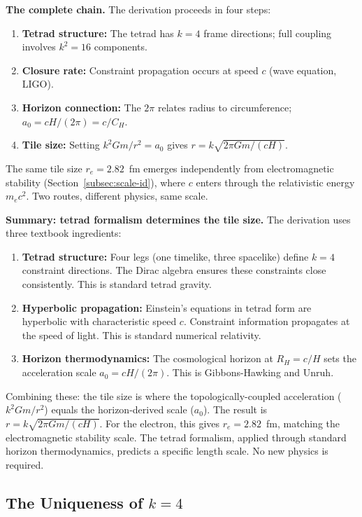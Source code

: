 \documentclass[aps,prd,preprint,superscriptaddress,showpacs,preprintnumbers,amsmath,amssymb,nofootinbib]{revtex4-2}
\begin{document}
\textbf{The complete chain.} The derivation proceeds in four steps:
\begin{enumerate}
\item \textbf{Tetrad structure:} The tetrad has $k=4$ frame directions; full coupling involves $k^2 = 16$ components.
\item \textbf{Closure rate:} Constraint propagation occurs at speed $c$ (wave equation, LIGO).
\item \textbf{Horizon connection:} The $2\pi$ relates radius to circumference; $a_0 = cH/(2\pi) = c/C_H$.
\item \textbf{Tile size:} Setting $k^2 Gm/r^2 = a_0$ gives $r = k\sqrt{2\pi Gm/(cH)}$.
\end{enumerate}
The same tile size $r_e = 2.82$~fm emerges independently from electromagnetic stability (Section~\ref{subsec:scale-id}), where $c$ enters through the relativistic energy $m_e c^2$. Two routes, different physics, same scale.

\textbf{Summary: tetrad formalism determines the tile size.} The derivation uses three textbook ingredients:
\begin{enumerate}
\item \textbf{Tetrad structure:} Four legs (one timelike, three spacelike) define $k=4$ constraint directions. The Dirac algebra ensures these constraints close consistently. This is standard tetrad gravity.
\item \textbf{Hyperbolic propagation:} Einstein's equations in tetrad form are hyperbolic with characteristic speed $c$. Constraint information propagates at the speed of light. This is standard numerical relativity.
\item \textbf{Horizon thermodynamics:} The cosmological horizon at $R_H = c/H$ sets the acceleration scale $a_0 = cH/(2\pi)$. This is Gibbons-Hawking and Unruh.
\end{enumerate}
Combining these: the tile size is where the topologically-coupled acceleration ($k^2 Gm/r^2$) equals the horizon-derived scale ($a_0$). The result is $r = k\sqrt{2\pi Gm/(cH)}$. For the electron, this gives $r_e = 2.82$~fm, matching the electromagnetic stability scale. The tetrad formalism, applied through standard horizon thermodynamics, predicts a specific length scale. No new physics is required.

\subsection{The Uniqueness of \texorpdfstring{$k=4$}{k=4}}
\label{subsec:uniqueness}
\end{document}
